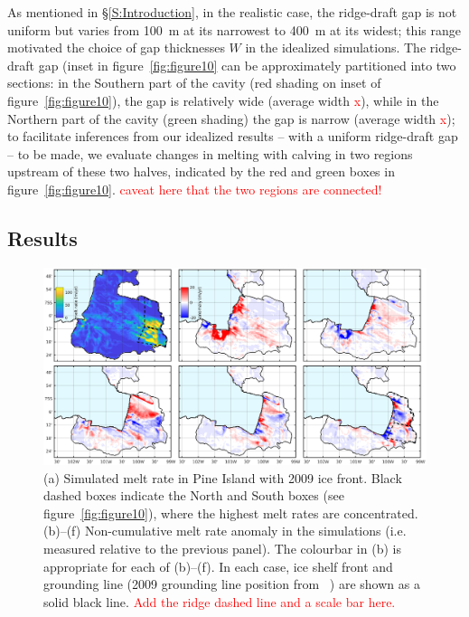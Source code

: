 \documentclass[draft]{agujournal2019}
\newcommand{\red}[1]{\textcolor{red}{#1}}
\begin{document}
As mentioned in \S\ref{S:Introduction}, in the realistic case, the ridge-draft gap is not uniform but varies from 100~m at its narrowest to 400~m at its widest; this range motivated the choice of gap thicknesses $W$ in the idealized simulations. The ridge-draft gap (inset in figure~\ref{fig:figure10} can be approximately partitioned into two sections: in the Southern part of the cavity (red shading on inset of figure~\ref{fig:figure10}), the gap is relatively wide (average width \red{x}), while in the Northern part of the cavity (green shading) the gap is narrow (average width \red{x}); to facilitate inferences from our idealized results -- with a uniform ridge-draft gap -- to be made, we evaluate changes in melting with calving in two regions upstream of these two halves, indicated by the red and green boxes in figure~\ref{fig:figure10}. \red{caveat here that the two regions are connected!}

\subsection{Results}

\begin{figure}
    \centering
    \includegraphics[width = \textwidth]{../make_figures/plots/figure11.eps}
    \caption{(a) Simulated melt rate in Pine Island with 2009 ice front. Black dashed boxes indicate the North and South boxes (see figure~\ref{fig:figure10}), where the highest melt rates are concentrated. (b)--(f) Non-cumulative melt rate anomaly in the simulations (i.e. measured relative to the previous panel). The colourbar in (b) is appropriate for each of (b)--(f). In each case, ice shelf front and grounding line (2009 grounding line position from ~\cite{Joughin2010GRL}) are shown as a solid black line. \red{Add the ridge dashed line and a scale bar here.}} 
    \label{fig:figure11}
\end{figure}
\end{document}
